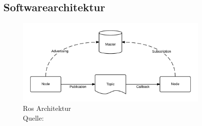 
\subsection{Softwarearchitektur}
\begin{figure}[htb]
	\centering
	\includegraphics[width=0.85\textwidth]{images/stand_der_technik/ros-master-node-topic}
	\caption[Ros Architektur]{Ros Architektur \\Quelle: \cite{ros-master-node-topicpng_nodate}}
	\label{fig:ros_master_node_topic}
\end{figure}
\FloatBarrier

